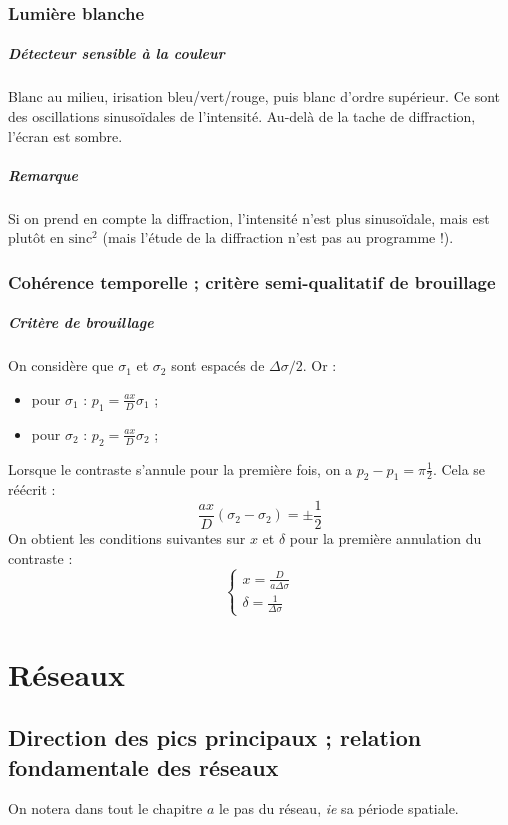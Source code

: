 \documentclass[french]{book}
\theoremstyle{plain}
\theoremstyle{definition}
\theoremstyle{remark}
\begin{document}
\subsection{Lumière blanche}
\paragraph{Détecteur sensible à la couleur} Blanc au milieu, irisation bleu/vert/rouge, puis blanc d'ordre supérieur. Ce sont des oscillations sinusoïdales de l'intensité. Au-delà de la tache de diffraction, l'écran est sombre.
\paragraph{Remarque} Si on prend en compte la diffraction, l'intensité n'est plus sinusoïdale, mais est plutôt en $\text{sinc}^2$ (mais l'étude de la diffraction n'est pas au programme !).
\subsection{Cohérence temporelle ; critère semi-qualitatif de brouillage}
\paragraph{Critère de brouillage} On considère que $\sigma_1$ et $\sigma_2$ sont espacés de $\Delta\sigma/2$. Or :
\begin{itemize}
	\item pour $\sigma_1$ : $p_1=\displaystyle\frac{ax}{D}\sigma_1$ ;
	\item pour $\sigma_2$ : $p_2=\displaystyle\frac{ax}{D}\sigma_2$ ;
\end{itemize} Lorsque le contraste s'annule pour la première fois, on a $p_2-p_1=\pi\displaystyle\frac{1}{2}$. Cela se réécrit : $$\frac{ax}{D}(\sigma_2-\sigma_2)=\pm\frac{1}{2}$$ On obtient les conditions suivantes sur $x$ et $\delta$ pour la première annulation du contraste : $$\begin{cases}
x=\displaystyle\frac{D}{a\Delta\sigma} \\
\delta=\displaystyle\frac{1}{\Delta\sigma}
\end{cases}$$

\chapter{Réseaux}
\localtableofcontents
\section{Direction des pics principaux ; relation fondamentale des réseaux}
On notera dans tout le chapitre $a$ le pas du réseau, \textit{ie} sa période spatiale.
\end{document}

